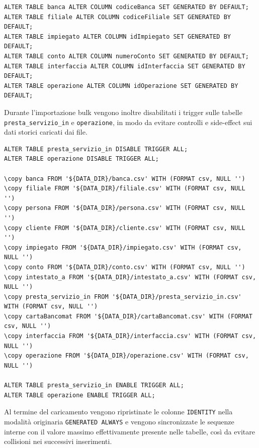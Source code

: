\begin{lstlisting}[caption={Gestione temporanea delle colonne IDENTITY}]
ALTER TABLE banca ALTER COLUMN codiceBanca SET GENERATED BY DEFAULT;
ALTER TABLE filiale ALTER COLUMN codiceFiliale SET GENERATED BY DEFAULT;
ALTER TABLE impiegato ALTER COLUMN idImpiegato SET GENERATED BY DEFAULT;
ALTER TABLE conto ALTER COLUMN numeroConto SET GENERATED BY DEFAULT;
ALTER TABLE interfaccia ALTER COLUMN idInterfaccia SET GENERATED BY DEFAULT;
ALTER TABLE operazione ALTER COLUMN idOperazione SET GENERATED BY DEFAULT;
\end{lstlisting}

Durante l'importazione bulk vengono inoltre disabilitati i trigger sulle tabelle \texttt{presta\_servizio\_in} e \texttt{operazione}, in modo da evitare controlli e side-effect sui dati storici caricati dai file.

\begin{lstlisting}[caption={Disabilitazione temporanea dei trigger durante il caricamento}]
ALTER TABLE presta_servizio_in DISABLE TRIGGER ALL;
ALTER TABLE operazione DISABLE TRIGGER ALL;

\copy banca FROM '${DATA_DIR}/banca.csv' WITH (FORMAT csv, NULL '')
\copy filiale FROM '${DATA_DIR}/filiale.csv' WITH (FORMAT csv, NULL '')
\copy persona FROM '${DATA_DIR}/persona.csv' WITH (FORMAT csv, NULL '')
\copy cliente FROM '${DATA_DIR}/cliente.csv' WITH (FORMAT csv, NULL '')
\copy impiegato FROM '${DATA_DIR}/impiegato.csv' WITH (FORMAT csv, NULL '')
\copy conto FROM '${DATA_DIR}/conto.csv' WITH (FORMAT csv, NULL '')
\copy intestato_a FROM '${DATA_DIR}/intestato_a.csv' WITH (FORMAT csv, NULL '')
\copy presta_servizio_in FROM '${DATA_DIR}/presta_servizio_in.csv' WITH (FORMAT csv, NULL '')
\copy cartaBancomat FROM '${DATA_DIR}/cartaBancomat.csv' WITH (FORMAT csv, NULL '')
\copy interfaccia FROM '${DATA_DIR}/interfaccia.csv' WITH (FORMAT csv, NULL '')
\copy operazione FROM '${DATA_DIR}/operazione.csv' WITH (FORMAT csv, NULL '')

ALTER TABLE presta_servizio_in ENABLE TRIGGER ALL;
ALTER TABLE operazione ENABLE TRIGGER ALL;
\end{lstlisting}

Al termine del caricamento vengono ripristinate le colonne \texttt{IDENTITY} nella modalità originaria \texttt{GENERATED ALWAYS} e vengono sincronizzate le sequenze interne con il valore massimo effettivamente presente nelle tabelle, così da evitare collisioni nei successivi inserimenti.

